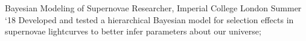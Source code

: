 \experience
    {Bayesian Modeling of Supernovae}
    {Researcher, Imperial College London}
    {Summer `18}
    {
        Developed and tested a hierarchical Bayesian model for selection effects in
        supernovae lightcurves to better infer parameters about our universe;
    }
